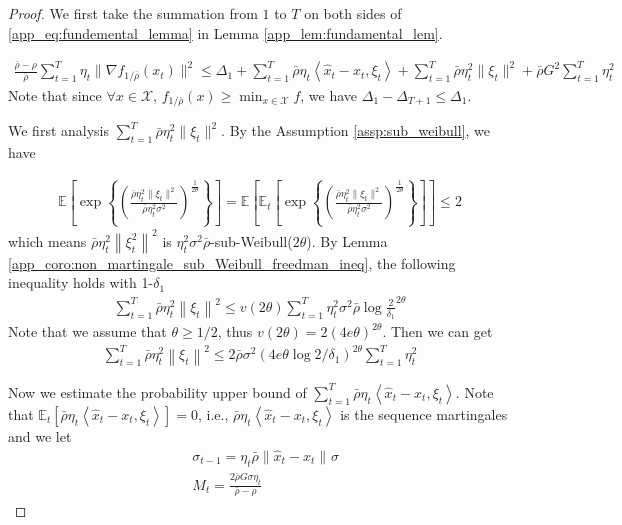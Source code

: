 \documentclass{article}
\def \E {\mathbb{E}}
\def \X {\mathcal{X}}
\def \brho {\bar{\rho}}
\def \hx {\hat{x}}
\def \sumT {\sum_{t=1}^T}
\newcommand{\Et}[1]{\E_t\left[#1\right]}
\newcommand{\Exp}[1]{\exp\left\{#1\right\}}
\newcommand{\norm}[2][]{\left\|#2\right\|^{#1}}
\newcommand{\innerdot}[2]{\left\langle #1 , #2 \right\rangle}
\newcommand{\Brace}[1]{\left(#1\right)}
\begin{document}
\begin{proof}
    

We first take the summation from $1$ to $T$ on both sides of \eqref{app_eq:fundemental_lemma} in Lemma \ref{app_lem:fundamental_lem}.

\begin{align}\label{app_eq:summation_fundemental_lemma}
    \frac{\brho-\rho}{\brho}\sum_{t=1}^T \eta_t\|\nabla f_{1/\brho}(x_t)\|^2 \leq \Delta_1 + \sum_{t=1}^T\brho\eta_t\left\langle \hx_t-x_t,\xi_t\right\rangle + \sum_{t=1}^T \brho \eta_t^2 \|\xi_t\|^2 + \brho G^2\sum_{t=1}^T \eta_t^2
\end{align}
Note that since $\forall x\in\X$, $f_{1/\brho}(x)\geq \min_{x\in\X}f$, we have $\Delta_1-\Delta_{T+1}\leq \Delta_1$. 

We first analysis $\sumT \brho\eta_t^2\|\xi_t\|^2$. By the Assumption \ref{assp:sub_weibull}, we have

\begin{align}
    \E\left[\Exp{\Brace{\frac{\brho\eta_t^2\|\xi_t\|^2}{\brho\eta_t^2\sigma^2}}^{\frac{1}{2\theta}}}\right]=\E\left[\Et{\Exp{\Brace{\frac{\brho\eta_t^2\|\xi_t\|^2}{\brho\eta_t^2\sigma^2}}^{\frac{1}{2\theta}}}}\right]\leq 2
\end{align}
which means $\bar{\rho}\eta_t^2\norm[2]{\xi_t^2}$ is $\eta_t^2\sigma^2\brho$-sub-Weibull($2\theta$). By Lemma \ref{app_coro:non_martingale_sub_Weibull_freedman_ineq}, the following inequality holds with 1-$\delta_1$
\begin{align}
    \sumT \brho\eta_t^2\norm[2]{\xi_t} \leq v(2\theta)\sumT \eta_t^2\sigma^2\brho \log{\frac{2}{\delta_1}}^{2\theta}
\end{align}
Note that we assume that $\theta\geq1/2$, thus $v(2\theta)=2(4e\theta)^{2\theta}$. Then we can get
\begin{align}\label{app_eq:HPB1_projSsGD}
     \sumT \brho\eta_t^2\norm[2]{\xi_t} \leq 2\brho\sigma^2\Brace{4e\theta\log{2/\delta_1}}^{2\theta}\sumT \eta_t^2
\end{align}

Now we estimate the probability upper bound of $\sumT \brho\eta_t\innerdot{\hx_t-x_t}{\xi_t}$. Note that $\Et{\brho\eta_t\innerdot{\hx_t-x_t}{\xi_t}}=0$, i.e., $\brho\eta_t\innerdot{\hx_t-x_t}{\xi_t}$ is the sequence martingales and we let 
\begin{align}
    &\sigma_{t-1} = \eta_t\brho\norm{\hx_t-x_t}\sigma\nonumber\\
    &M_t = \frac{2\brho G\sigma\eta_t}{\brho-\rho}\nonumber
\end{align}


\end{proof}
\end{document}
